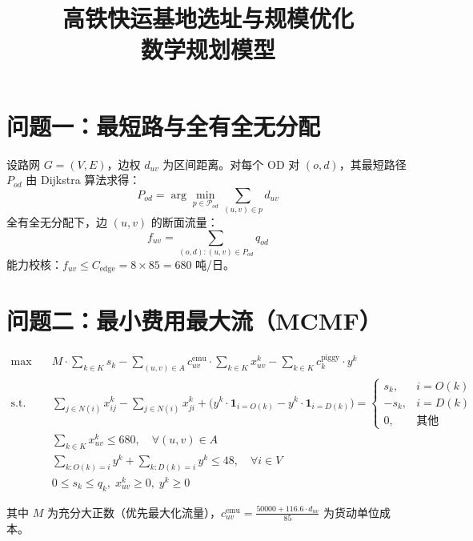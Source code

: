 \documentclass[12pt,a4paper,fontset=none]{ctexart}
\begin{document}
\title{高铁快运基地选址与规模优化\\数学规划模型}
\author{}
\date{}
\maketitle

\section*{问题一：最短路与全有全无分配}

设路网 $G=(V,E)$，边权 $d_{uv}$ 为区间距离。对每个 OD 对 $(o,d)$，其最短路径 $P_{od}$ 由 Dijkstra 算法求得：
\begin{equation}
P_{od} = \arg\min_{p \in \mathcal{P}_{od}} \sum_{(u,v) \in p} d_{uv}
\end{equation}
全有全无分配下，边 $(u,v)$ 的断面流量：
\begin{equation}
f_{uv} = \sum_{(o,d): (u,v) \in P_{od}} q_{od}
\end{equation}
能力校核：$f_{uv} \leq C_{\text{edge}} = 8 \times 85 = 680$ 吨/日。

\section*{问题二：最小费用最大流（MCMF）}

\begin{align}
\max\quad & M \cdot \sum_{k \in K} s_k - \sum_{(u,v) \in A} c_{uv}^{\text{emu}} \cdot \sum_{k \in K} x_{uv}^k - \sum_{k \in K} c_k^{\text{piggy}} \cdot y^k \nonumber\\
\text{s.t.}\quad & \sum_{j \in N(i)} x_{ij}^k - \sum_{j \in N(i)} x_{ji}^k + \big(y^k \cdot \mathbf{1}_{i=O(k)} - y^k \cdot \mathbf{1}_{i=D(k)}\big) = 
\begin{cases}
s_k, & i=O(k)\\
-s_k, & i=D(k)\\
0,   & \text{其他}
\end{cases} \nonumber\\
& \sum_{k \in K} x_{uv}^k \leq 680,\quad \forall (u,v) \in A \nonumber\\
& \sum_{k: O(k)=i} y^k + \sum_{k: D(k)=i} y^k \leq 48,\quad \forall i \in V \nonumber\\
& 0 \leq s_k \leq q_k,\; x_{uv}^k \geq 0,\; y^k \geq 0 \nonumber
\end{align}

其中 $M$ 为充分大正数（优先最大化流量），$c_{uv}^{\text{emu}} = \frac{50000 + 116.6 \cdot d_{uv}}{85}$ 为货动单位成本。
\end{document}
